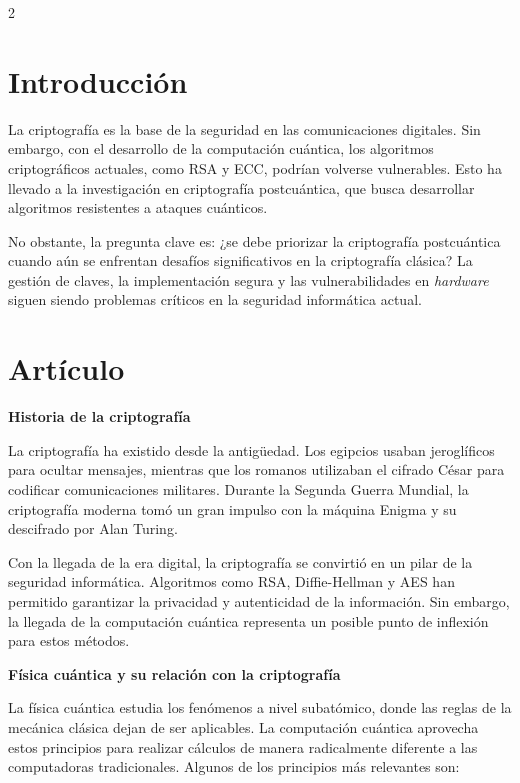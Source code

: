 \documentclass[12pt,spanish,Letterpaper,openany]{book}
\begin{document}
\begin {multicols}{2}
\hypertarget{introducciuxf3n-8}{%
\section{Introducción}\label{introducciuxf3n-8}}

La criptografía es la base de la seguridad en las comunicaciones digitales. Sin embargo, con el desarrollo de la computación cuántica, los algoritmos criptográficos actuales, como RSA y ECC, podrían volverse vulnerables. Esto ha llevado a la investigación en criptografía postcuántica, que busca desarrollar algoritmos resistentes a ataques cuánticos.

No obstante, la pregunta clave es: ¿se debe priorizar la criptografía postcuántica cuando aún se enfrentan desafíos significativos en la criptografía clásica? La gestión de claves, la implementación segura y las vulnerabilidades en \emph{hardware} siguen siendo problemas críticos en la seguridad informática actual.

\hypertarget{artuxedculo-7}{%
\section{Artículo}\label{artuxedculo-7}}

\textbf{Historia de la criptografía }

La criptografía ha existido desde la antigüedad. Los egipcios usaban jeroglíficos para ocultar mensajes, mientras que los romanos utilizaban el cifrado César para codificar comunicaciones militares. Durante la Segunda Guerra Mundial, la criptografía moderna tomó un gran impulso con la máquina Enigma y su descifrado por Alan Turing.

Con la llegada de la era digital, la criptografía se convirtió en un pilar de la seguridad informática. Algoritmos como RSA, Diffie-Hellman y AES han permitido garantizar la privacidad y autenticidad de la información. Sin embargo, la llegada de la computación cuántica representa un posible punto de inflexión para estos métodos.

\textbf{Física cuántica y su relación con la criptografía}

La física cuántica estudia los fenómenos a nivel subatómico, donde las reglas de la mecánica clásica dejan de ser aplicables. La computación cuántica aprovecha estos principios para realizar cálculos de manera radicalmente diferente a las computadoras tradicionales. Algunos de los principios más relevantes son:


\end{multicols}
\end{document}
